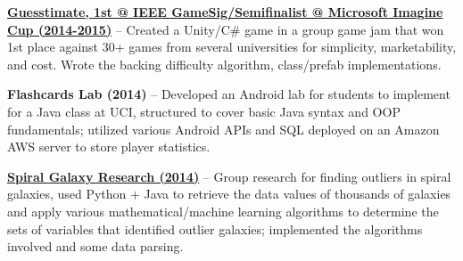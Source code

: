 \documentclass[letterpaper,MMMyyyy,nonstopmode]{simpleresumecv}
\begin{document}
\begin{Body}
\Entry
\BulletItem
\href{https://github.com/brendonwai/PAS}
{\textbf{Guesstimate, 1st @ IEEE GameSig/Semifinalist @ Microsoft Imagine Cup (2014-2015)}} -- Created a Unity/C\# game in a group game jam that won 1st place against 30+ games from several universities for simplicity, marketability, and cost. Wrote the backing difficulty algorithm, class/prefab implementations.\newline

\Entry
\BulletItem
{\textbf{Flashcards Lab (2014)}} -- Developed an Android lab for students to implement for a Java class at UCI, structured to cover basic Java syntax and OOP fundamentals; utilized various Android APIs and SQL deployed on an Amazon AWS server to store player statistics.\newline

\Entry
\BulletItem
\href{https://github.com/SVT125/Research-CS199}
{\textbf{Spiral Galaxy Research (2014)}} -- Group research for finding outliers in spiral galaxies, used Python + Java to retrieve the data values of thousands of galaxies and apply various mathematical/machine learning algorithms to determine the sets of variables that identified outlier galaxies; implemented the algorithms involved and some data parsing.\newline

\end{Body}
\end{document}
